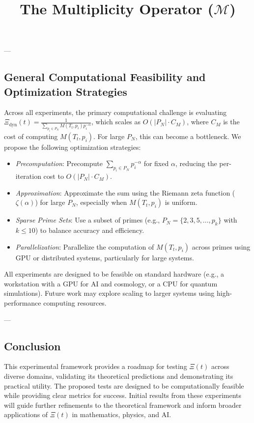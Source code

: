 \documentclass{article}
\theoremstyle{plain}
\begin{document}
\begin{itemize}
---

\subsection{General Computational Feasibility and Optimization Strategies}
\label{subsec:comp_feasibility}

Across all experiments, the primary computational challenge is evaluating \( \Xi_{\text{dyn}}(t) = \frac{1}{\sum_{p_i \in P_N} M(T_t, p_i) p_i^{-\alpha}} \), which scales as \( O(|P_N| \cdot C_M) \), where \( C_M \) is the cost of computing \( M(T_t, p_i) \). For large \( P_N \), this can become a bottleneck. We propose the following optimization strategies:
\begin{itemize}
    \item \textit{Precomputation}: Precompute \( \sum_{p_i \in P_N} p_i^{-\alpha} \) for fixed \( \alpha \), reducing the per-iteration cost to \( O(|P_N| \cdot C_M) \).
    \item \textit{Approximation}: Approximate the sum using the Riemann zeta function (\( \zeta(\alpha) \)) for large \( P_N \), especially when \( M(T_t, p_i) \) is uniform.
    \item \textit{Sparse Prime Sets}: Use a subset of primes (e.g., \( P_N = \{2, 3, 5, \ldots, p_k\} \) with \( k \leq 10 \)) to balance accuracy and efficiency.
    \item \textit{Parallelization}: Parallelize the computation of \( M(T_t, p_i) \) across primes using GPU or distributed systems, particularly for large systems.
\end{itemize}

All experiments are designed to be feasible on standard hardware (e.g., a workstation with a GPU for AI and cosmology, or a CPU for quantum simulations). Future work may explore scaling to larger systems using high-performance computing resources.

---

\subsection{Conclusion}

This experimental framework provides a roadmap for testing \(\Xi(t) \) across diverse domains, validating its theoretical predictions and demonstrating its practical utility. The proposed tests are designed to be computationally feasible while providing clear metrics for success. Initial results from these experiments will guide further refinements to the theoretical framework and inform broader applications of \(\Xi(t) \) in mathematics, physics, and AI.
\title{The Multiplicity Operator (\( \mathcal{M} \))}


\end{itemize}
\end{document}
